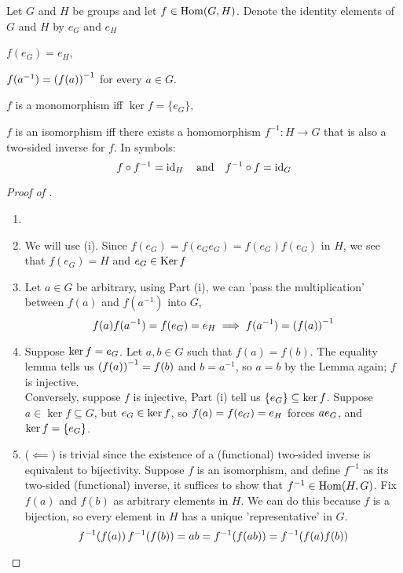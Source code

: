 \documentclass[../main-manifolds.tex]{subfiles}
\begin{document}
\begin{wts}\label{hungerford-chp1:theorem2.3}
    Let $G$ and $H$ be groups and let $f\in \Hom[G,H]$. Denote the identity elements of $G$ and $H$ by $e_G$ and $e_H$
    \begin{enumroman}
        \item $f(e_G)=e_H$,
        \item $f(a^{-1})=\qty(f(a))^{-1}$ for every $a\in G$.
        \item $f$ is a monomorphism iff $\ker f = \{e_G\}$,
        \item $f$ is an isomorphism iff there exists a homomorphism $f^{-1}: H\to G$ that is also a two-sided inverse for $f$. In symbols:
        \begin{equation}\label{hungerford-chp1:theorem2.3-isomorphism-equation}
            f\circ f^{-1}=\id{H}\qqtext{and}f^{-1}\circ f=\id{G}
        \end{equation}
    \end{enumroman}
\end{wts}
\begin{proof}[Proof of ]
    \begin{enumerate}[label={Proof of Part (\roman*): },leftmargin=*]
        \item[]
        \item We will use  (i). Since $f(e_G)=f(e_Ge_G)=f(e_G)f(e_G)$ in $H$, we see that $f(e_G)=H$ and $e_G\in \operatorname{Ker}{f}$
        \item Let $a\in G$ be arbitrary, using Part (i), we can 'pass the multiplication' between $f(a)$ and $f(a^{-1})$ into $G$, 
        \[
            f(a)f(a^{-1})=f(e_G)=e_H\implies f(a^{-1})=\qty(f(a))^{-1}
        \]
        \item Suppose $\ker{f}={e_G}$. Let $a,b\in G$ such that $f(a)=f(b)$. The equality lemma  tells us $\qty(f(a))^{-1}=f(b)$ and $b=a^{-1}$, so $a=b$ by the Lemma again; $f$ is injective.\\

        Conversely, suppose $f$ is injective, Part (i) tell us $\{e_G\}\subseteq \ker{f}$. Suppose $a\in \ker{f}\subseteq G$, but $e_G\in\ker{f}$, so $f(a)=f(e_G)=e_H$ forces $ae_G$, and $\ker{f}=\{e_G\}$.
        \item ($\impliedby$) is trivial since the existence of a (functional) two-sided inverse is equivalent to bijectivity. Suppose $f$ is an isomorphism, and define $f^{-1}$ as its two-sided (functional) inverse, it suffices to show that $f^{-1}\in\Hom[H,G]$. Fix $f(a)$ and $f(b)$ as arbitrary elements in $H$. We can do this because $f$ is a bijection, so every element in $H$ has a unique 'representative' in $G$. 
        \[
            f^{-1}\qty(f(a))\,f^{-1}\qty(f(b))=ab=f^{-1}\qty(f(ab))=f^{-1}\qty(f(a)f(b))
        \]
    \end{enumerate}
\end{proof}
    
\end{document}

